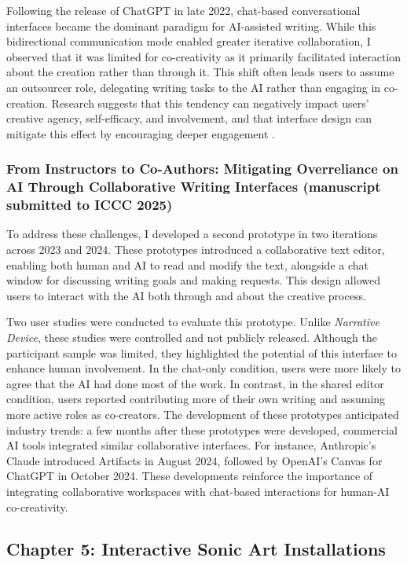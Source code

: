 Following the release of ChatGPT in late 2022, chat-based conversational interfaces became the dominant paradigm for AI-assisted writing. While this bidirectional communication mode enabled greater iterative collaboration, I observed that it was limited for co-creativity as it primarily facilitated interaction about the creation rather than through it. This shift often leads users to assume an outsourcer role, delegating writing tasks to the AI rather than engaging in co-creation. Research suggests that this tendency can negatively impact users’ creative agency, self-efficacy, and involvement, and that interface design can mitigate this effect by encouraging deeper engagement \cite{Kantosalo2016-hg, McGuire2024-im}.

\subsubsection{From Instructors to Co-Authors: Mitigating Overreliance on AI Through Collaborative Writing Interfaces (manuscript submitted to ICCC 2025)} To address these challenges, I developed a second prototype in two iterations across 2023 and 2024. These prototypes introduced a collaborative text editor, enabling both human and AI to read and modify the text, alongside a chat window for discussing writing goals and making requests. This design allowed users to interact with the AI both through and about the creative process. 

Two user studies were conducted to evaluate this prototype. Unlike \textit{Narrative Device}, these studies were controlled and not publicly released. Although the participant sample was limited, they highlighted the potential of this interface to enhance human involvement. In the chat-only condition, users were more likely to agree that the AI had done most of the work. In contrast, in the shared editor condition, users reported contributing more of their own writing and assuming more active roles as co-creators. The development of these prototypes anticipated industry trends: a few months after these prototypes were developed, commercial AI tools integrated similar collaborative interfaces. For instance, Anthropic’s Claude introduced Artifacts in August 2024, followed by OpenAI’s Canvas for ChatGPT in October 2024. These developments reinforce the importance of integrating collaborative workspaces with chat-based interactions for human-AI co-creativity.

\subsection{Chapter 5: Interactive Sonic Art Installations}


